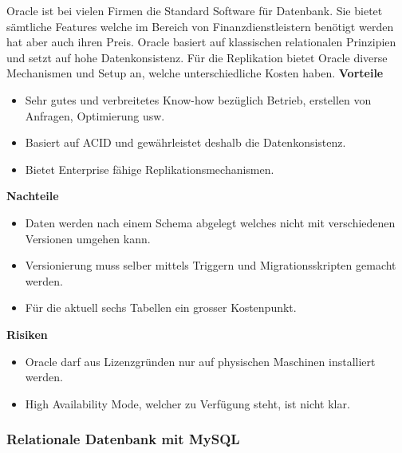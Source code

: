 Oracle ist bei vielen Firmen die Standard Software für Datenbank. Sie bietet sämtliche Features welche im Bereich von Finanzdienstleistern benötigt werden hat aber auch ihren Preis. Oracle basiert auf klassischen relationalen Prinzipien und setzt auf hohe Datenkonsistenz. Für die Replikation bietet Oracle diverse Mechanismen und Setup an, welche unterschiedliche Kosten haben.
\newline
\newline
\textbf{Vorteile}
\begin{itemize}
	\item Sehr gutes und verbreitetes Know-how bezüglich Betrieb, erstellen von Anfragen, Optimierung usw.
	\item Basiert auf \Gls{ACID} und gewährleistet deshalb die Datenkonsistenz.
	\item Bietet Enterprise fähige Replikationsmechanismen.
\end{itemize}
\textbf{Nachteile}
\begin{itemize}
	\item Daten werden nach einem Schema abgelegt welches nicht mit verschiedenen Versionen umgehen kann.
	\item Versionierung muss selber mittels Triggern und Migrationsskripten gemacht werden.	
	\item Für die aktuell sechs Tabellen ein grosser Kostenpunkt. 
\end{itemize}
\textbf{Risiken}
\begin{itemize}
	\item Oracle darf aus Lizenzgründen nur auf physischen Maschinen installiert werden.
	\item High Availability Mode, welcher zu Verfügung steht, ist nicht klar.
\end{itemize}

\subsubsection{Relationale Datenbank mit MySQL}

